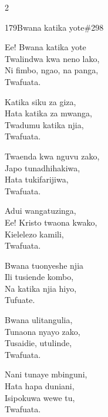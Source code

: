 \begin{multicols}{2}
\begin{hymn}{179}{Bwana katika yote}{\#298}
\begin{stanza}
Ee! Bwana katika yote\\
Twalindwa kwa neno lako,\\
Ni fimbo, ngao, na panga,\\
Twafuata.
\end{stanza}
\begin{stanza}
Katika siku za giza,\\
Hata katika za mwanga,\\
Twadumu katika njia,\\
Twafuata.
\end{stanza}
\begin{stanza}
Twaenda kwa nguvu zako,\\
Japo tunadhihakiwa,\\
Hata tukifarijiwa,\\
Twafuata.
\end{stanza}
\begin{stanza}
Adui wangatuzinga,\\
Ee! Kristo twaona kwako,\\
Kielelezo kamili,\\
Twafuata.
\end{stanza}
\begin{stanza}
Bwana tuonyeshe njia\\
Ili tusiende kombo,\\
Na katika njia hiyo,\\
Tufuate.
\end{stanza}
\begin{stanza}
Bwana ulitangulia,\\
Tunaona nyayo zako,\\
Tusaidie, utulinde,\\
Twafuata.
\end{stanza}
\begin{stanza}
Nani tunaye mbinguni,\\
Hata hapa duniani,\\
Isipokuwa wewe tu,\\
Twafuata.
\end{stanza}
\end{hymn}


\end{multicols}
